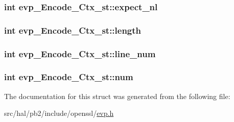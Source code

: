 \subsubsection[{\texorpdfstring{expect\+\_\+nl}{expect_nl}}]{\setlength{\rightskip}{0pt plus 5cm}int evp\+\_\+\+Encode\+\_\+\+Ctx\+\_\+st\+::expect\+\_\+nl}\hypertarget{structevp___encode___ctx__st_ae152066ba261286f7521992aefbfa952}{}\label{structevp___encode___ctx__st_ae152066ba261286f7521992aefbfa952}
\subsubsection[{\texorpdfstring{length}{length}}]{\setlength{\rightskip}{0pt plus 5cm}int evp\+\_\+\+Encode\+\_\+\+Ctx\+\_\+st\+::length}\hypertarget{structevp___encode___ctx__st_ab5409ce49d7af9d0320f5bd1c9bbdfd4}{}\label{structevp___encode___ctx__st_ab5409ce49d7af9d0320f5bd1c9bbdfd4}
\subsubsection[{\texorpdfstring{line\+\_\+num}{line_num}}]{\setlength{\rightskip}{0pt plus 5cm}int evp\+\_\+\+Encode\+\_\+\+Ctx\+\_\+st\+::line\+\_\+num}\hypertarget{structevp___encode___ctx__st_a92d2880fa44acb614cff2005fe3d74e3}{}\label{structevp___encode___ctx__st_a92d2880fa44acb614cff2005fe3d74e3}
\subsubsection[{\texorpdfstring{num}{num}}]{\setlength{\rightskip}{0pt plus 5cm}int evp\+\_\+\+Encode\+\_\+\+Ctx\+\_\+st\+::num}\hypertarget{structevp___encode___ctx__st_a7a68545e6131f26113bc316cb66e794d}{}\label{structevp___encode___ctx__st_a7a68545e6131f26113bc316cb66e794d}


The documentation for this struct was generated from the following file\+:\begin{DoxyCompactItemize}
\item 
src/hal/pb2/include/openssl/\hyperlink{evp_8h}{evp.\+h}\end{DoxyCompactItemize}
